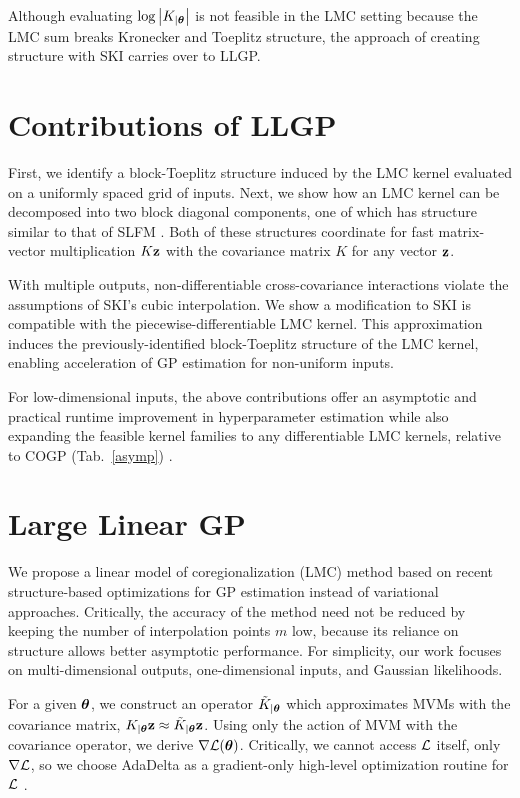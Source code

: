 \documentclass{article}
\begin{document}
Although evaluating $\log\left|K_{|{\boldsymbol\theta}}\right|$ is not feasible in the LMC setting because the LMC sum breaks Kronecker and Toeplitz structure, the approach of creating structure with SKI carries over to LLGP.

\section{Contributions of LLGP}\label{sec:contributions}

First, we identify a block-Toeplitz structure induced by the LMC kernel evaluated on a uniformly spaced grid of inputs. Next, we show how an LMC kernel can be decomposed into two block diagonal components, one of which has structure similar to that of SLFM \cite{seeger2005semiparametric}. Both of these structures coordinate for fast matrix-vector multiplication $K\textbf{z}$ with the covariance matrix $K$ for any vector $\textbf{z}$.

With multiple outputs, non-differentiable cross-covariance interactions violate the assumptions of SKI's cubic interpolation. We show a modification to SKI is compatible with the piecewise-differentiable LMC kernel. This approximation induces the previously-identified block-Toeplitz structure of the LMC kernel, enabling acceleration of GP estimation for non-uniform inputs.

For low-dimensional inputs, the above contributions offer an asymptotic and practical runtime improvement in hyperparameter estimation while also expanding the feasible kernel families to any differentiable LMC kernels, relative to COGP (Tab.~\ref{asymp}) \cite{nguyen2014collaborative}.

\section{Large Linear GP} \label{sec:matrix-free}

We propose a linear model of coregionalization (LMC) method based on recent structure-based optimizations for GP estimation instead of variational approaches. Critically, the accuracy of the method need not be reduced by keeping the number of interpolation points $m$ low, because its reliance on structure allows better asymptotic performance.
For simplicity, our work focuses on multi-dimensional outputs, one-dimensional inputs, and Gaussian likelihoods.

For a given ${\boldsymbol\theta}$, we construct an operator $\tilde{K}_{|{\boldsymbol\theta}}$ which approximates MVMs with the covariance matrix, $K_{|{\boldsymbol\theta}}\textbf{z}\approx \tilde{K}_{|{\boldsymbol\theta}}\textbf{z}$. Using only the action of MVM with the covariance operator, we derive $\nabla\mathcal{L}({\boldsymbol\theta})$. Critically, we cannot access $\mathcal{L}$ itself, only $\nabla\mathcal{L}$, so we choose AdaDelta as a gradient-only high-level optimization routine for $\mathcal{L}$ \cite{zeiler2012adadelta}.
\end{document}

